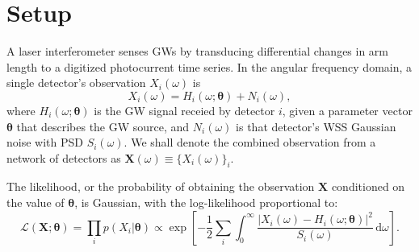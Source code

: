 \documentclass{iopart}
\begin{document}
\section{Setup}

A laser interferometer senses \acp{GW} by transducing differential changes in arm length to a digitized photocurrent time series. In the angular frequency domain, a single detector's observation $X_i(\omega)$ is
%
\begin{equation}\label{eq:signal-model}
	X_i (\omega) = H_i (\omega; \boldsymbol\theta) + N_i (\omega),
\end{equation}
%
where $H_i (\omega; \boldsymbol\theta)$ is the \ac{GW} signal receied by detector $i$, given a parameter vector $\boldsymbol\theta$ that describes the \ac{GW} source, and $N_i (\omega)$ is that detector's \ac{WSS} Gaussian noise with \ac{PSD} $S_i(\omega)$. We shall denote the combined observation from a network of detectors as $\mathbf X (\omega) \equiv \{X_i (\omega)\}_i$.

The likelihood, or the probability of obtaining the observation $\mathbf X$ conditioned on the value of $\boldsymbol\theta$, is Gaussian, with the log\nobreakdashes-likelihood proportional to:
%
\begin{equation}\label{eq:gaussian-likelihood}
	\mathcal{L}(\mathbf X; \boldsymbol\theta) = \prod_i p(X_i | \boldsymbol\theta)
		\propto \exp \left[
		- \frac{1}{2} \sum_i \int_0^\infty \frac{\left|X_i (\omega)
			- H_i(\omega; \boldsymbol\theta) \right|^2}{S_i(\omega)} \, \mathrm{d}\omega
	\right].
\end{equation}
\end{document}
